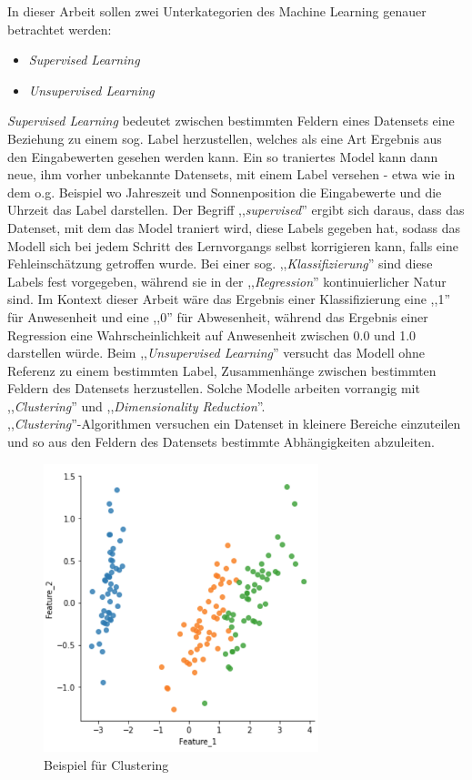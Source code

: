 In dieser Arbeit sollen zwei Unterkategorien des Machine Learning genauer betrachtet werden:
\begin{itemize}
    \item \textit{Supervised Learning} 
    \item \textit{Unsupervised Learning}
\end{itemize}
\textit{Supervised Learning} bedeutet zwischen bestimmten Feldern eines Datensets eine Beziehung
zu einem sog. Label herzustellen, welches als eine Art Ergebnis aus den Eingabewerten gesehen 
werden kann. Ein so traniertes Model kann dann neue, ihm vorher unbekannte Datensets, mit einem 
Label versehen - etwa wie in dem o.g. Beispiel wo Jahreszeit und Sonnenposition die Eingabewerte 
und die Uhrzeit das Label darstellen. Der Begriff ,,\textit{supervised}'' ergibt sich daraus, dass 
das Datenset, mit dem das Model traniert wird, diese Labels gegeben 
hat, sodass das Modell sich bei jedem Schritt des Lernvorgangs selbst korrigieren kann, falls 
eine Fehleinschätzung getroffen wurde.
Bei einer sog. ,,\textit{Klassifizierung}'' sind diese Labels fest vorgegeben, während sie in der 
,,\textit{Regression}'' kontinuierlicher Natur sind. Im Kontext dieser Arbeit wäre das Ergebnis einer 
Klassifizierung eine ,,1'' für Anwesenheit und eine ,,0'' für Abwesenheit, während das Ergebnis einer 
Regression eine Wahrscheinlichkeit auf Anwesenheit zwischen 0.0 und 1.0 darstellen würde.
\newpage
Beim ,,\textit{Unsupervised Learning}'' versucht das Modell ohne Referenz zu einem bestimmten 
Label, Zusammenhänge zwischen bestimmten Feldern des Datensets herzustellen. Solche Modelle 
arbeiten vorrangig mit ,,\textit{Clustering}'' und ,,\textit{Dimensionality Reduction}''.\\
,,\textit{Clustering}''-Algorithmen versuchen ein Datenset in kleinere Bereiche einzuteilen und
so aus den Feldern des Datensets bestimmte Abhängigkeiten abzuleiten.

\begin{figure}[h]
    \centering
    \includegraphics[width=8.0cm]{./pic/Clustering_Beispiel.png}
    \caption{Beispiel für Clustering}
    \label{fig:Clustering_Beispiel}
\end{figure}


